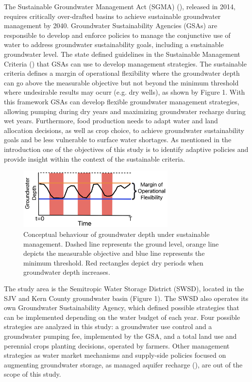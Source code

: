 \documentclass[11pt,a4paper]{article}
\begin{document}
 The Sustainable Groundwater Management Act (SGMA) (\cite{dwr_sustainable_2021}), released in 2014, requires critically over-drafted basins to achieve sustainable groundwater management by 2040. Groundwater Sustainability Agencies (GSAs) are responsible to develop and enforce policies to manage the conjunctive use of water to address groundwater sustainability goals, including a sustainable groundwater level. The state defined  guidelines in the Sustainable Management Criteria (\cite{dwr_sustainable_2017}) that GSAs can use to develop management strategies. The sustainable criteria defines a margin of operational flexibility where the groundwater depth can go above the measurable objective but not beyond the minimum threshold where undesirable results may ocurr (e.g. dry wells), as shown by Figure 1. With this framework GSAs can develop flexible groundwater management strategies, allowing pumping during dry years and maximizing groundwater recharge during wet years. Furthermore, food production needs to adapt water and land allocation decisions, as well as crop choice, to achieve groundwater sustainability goals and be less vulnerable to surface water shortages. As mentioned in the introduction one of the objectives of this study is to identify adaptive policies and provide insight within the context of the sustainable criteria.

 \begin{figure}[H]
    \centering
    \includegraphics[width=0.7\textwidth]{conceptual_sgma_policy.jpg}
    \caption{Conceptual behaviour of groundwater depth under sustainable management. Dashed line represents the ground level, orange line depicts the measurable objective and blue line represents the minimum threshold. Red rectangles depict dry periods when groundwater depth increases.}
    \label{fig:1}
\end{figure}
  
The study area is the Semitropic Water Storage District (SWSD), located in the SJV and Kern County groundwater basin (Figure 1). The SWSD also operates its own Groundwater Sustainability Agency, which defined possible strategies that can be implemented depending on the water budget of each year. Four possible strategies are analyzed in this study: a groundwater use control and a groundwater pumping fee, implemented by the GSA, and a total land use and perennial crops planting decisions, operated by farmers. Other management strategies as water market mechanisms and supply-side policies focused on augmenting groundwater storage, as managed aquifer recharge (\cite{ulibarri_assessing_2021}), are out of the scope of this study. 
\end{document}
